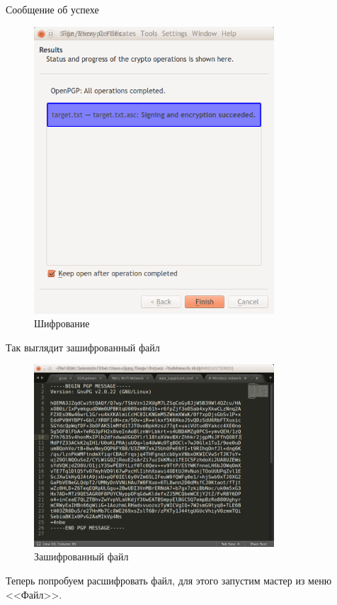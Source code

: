 Сообщение об успехе

\begin{figure}[H]
	\centering
	\includegraphics[width=0.8\textwidth]{images/14.png}
	\caption{Шифрование}
\end{figure}

Так выглядит зашифрованный файл

\begin{figure}[H]
	\centering
	\includegraphics[width=0.8\textwidth]{images/15.png}
	\caption{Зашифрованный файл}
\end{figure}

Теперь попробуем расшифровать файл, для этого запустим мастер из меню <<Файл>>.

